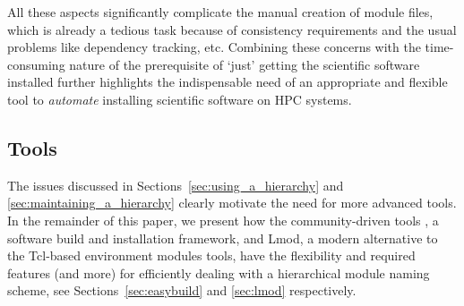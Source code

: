 All these aspects significantly complicate the manual creation of module files, which
is already a tedious task because of consistency requirements and the usual problems
like dependency tracking, etc. Combining these concerns with the time-consuming
nature of the prerequisite of `just' getting the scientific software installed
further highlights the indispensable need of an appropriate and flexible tool to
\emph{automate} installing scientific software on HPC systems.

\subsection{Tools}
\label{sec:tools_for_hierarchical}

The issues discussed in Sections~\ref{sec:using_a_hierarchy} and
\ref{sec:maintaining_a_hierarchy} clearly motivate the need for more advanced tools.
In the remainder of this paper, we present how the community-driven tools
\easybuild{}, a software build and installation framework, and Lmod, a modern
alternative to the Tcl-based environment modules tools, have the flexibility and
required features (and more) for efficiently dealing with a hierarchical module
naming scheme, see Sections~\ref{sec:easybuild} and \ref{sec:lmod} respectively.
